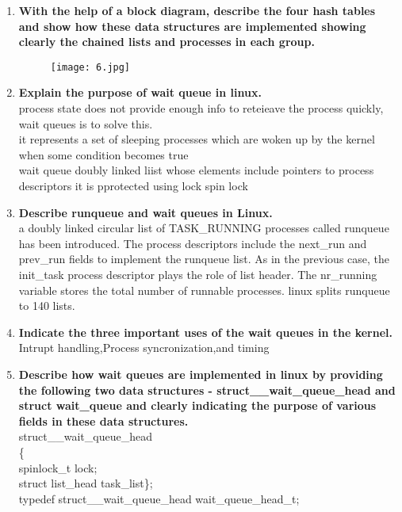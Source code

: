 \documentclass[a4paper,12pt]{article}
\begin{document}
\begin{flushleft}
\begin{enumerate}
{PIDTYPE\_PGID; pgrp field ; PID of the group leader process\\
PIDTYPE\_SID ; session field ; PID of the session leader process}
\item \textbf{ With the help of a block diagram, describe the four hash tables and show how these data structures are implemented showing clearly the chained lists and processes in each group.}
\begin{figure}[H]
 \centering
  \texttt{[image: 6.jpg]}
  \label{fig:6}
\end{figure}
\item \textbf{ Explain the purpose of wait queue in linux.\\}
{\color{red}process state does not provide enough info to reteieave the process quickly, wait queues is to solve this.\\
it represents a set of sleeping processes which are woken up by the kernel when some condition becomes true\\
wait queue doubly linked liist whose elements include pointers to process descriptors it is pprotected using lock spin lock}
\item \textbf{ Describe runqueue and wait queues in Linux.\\}
{\color{red}a doubly linked circular list of TASK\_RUNNING
processes called runqueue has been introduced. The process descriptors include the next\_run
and prev\_run fields to implement the runqueue list. As in the previous case, the init\_task
process descriptor plays the role of list header. The nr\_running variable stores the total
number of runnable processes. linux splits runqueue to 140 lists.}
\item \textbf{ Indicate the three important uses of the wait queues in the kernel.\\}
{\color{red}Intrupt handling,Process syncronization,and timing}
\item \textbf{ Describe how wait queues are implemented in linux by providing the following two data structures - struct\_\_wait\_queue\_head and struct wait\_queue and clearly indicating the purpose of various fields in these data structures.\\}
{\color{red} struct\_\_wait\_queue\_head\\\{\\spinlock\_t lock;\\struct list\_head task\_list\};\\typedef struct\_\_wait\_queue\_head wait\_queue\_head\_t;\\
}
\end{enumerate}
\end{flushleft}
\end{document}
